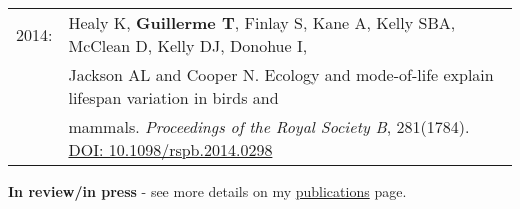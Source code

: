 \documentclass[10pt,a4paper]{article}
\begin{document}
{\bigskip

\begin{tabular}{ll}
2014: & Healy K, \textbf{Guillerme T}, Finlay S, Kane A, Kelly SBA, McClean D, Kelly DJ, Donohue I,\\
      & Jackson AL and Cooper N. Ecology and mode-of-life explain lifespan variation in birds and \\
      & mammals. \textit{Proceedings of the Royal Society B}, 281(1784). \href{http://rspb.royalsocietypublishing.org/content/281/1784/20140298}{DOI: 10.1098/rspb.2014.0298}\\ %
\end{tabular}

\bigskip

\raggedright\textbf{In review/in press} - see more details on my \href{http://tguillerme.github.io/publications.html}{publications} page.







\bigskip




}
\end{document}

